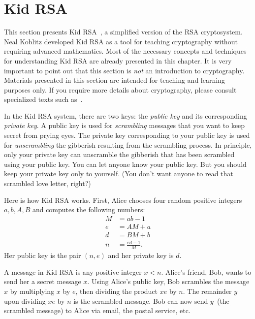 
\section{Kid RSA}

This section presents Kid RSA~\cite[p.17]{Koblitz1998}, a simplified
version of the RSA cryptosystem. Neal
Koblitz developed Kid RSA as a
tool for teaching cryptography without requiring advanced
mathematics. Most of the necessary concepts and techniques for
understanding Kid RSA are already presented in this chapter. It is
very important to point out that this section is \emph{not} an
introduction to cryptography. Materials presented in this section are
intended for teaching and learning purposes only. If you require more
details about cryptography, please consult specialized texts such
as~\cite{MenezesEtAl1996,Stinson2006,TrappeWashington2006}.

In the Kid RSA system, there are two keys: the
\emph{public key} and its corresponding
\emph{private key}. A public key is used for
\emph{scrambling} messages that you want to keep secret from prying
eyes. The private key corresponding to your public key is used for
\emph{unscrambling} the gibberish resulting from the scrambling
process. In principle, only your private key can unscramble the
gibberish that has been scrambled using your public key. You can let
anyone know your public key. But you should keep your private key only
to yourself. (You don't want anyone to read that scrambled love
letter, right?)

Here is how Kid RSA works. First, Alice chooses four random positive
integers $a, b, A, B$ and computes the following numbers:
%
\begin{align*}
M &= ab - 1 \\[4pt]
e &= AM + a \\[4pt]
d &= BM + b \\[4pt]
n &= \frac{ed - 1}{M}.
\end{align*}
%
Her public key is the pair $(n, e)$ and her private key is $d$.

A message in Kid RSA is any positive integer $x < n$. Alice's friend,
Bob, wants to send her a secret message $x$. Using Alice's public key,
Bob scrambles the message $x$ by multiplying $x$ by $e$, then dividing
the product $xe$ by $n$. The remainder $y$ upon dividing $xe$ by $n$
is the scrambled message. Bob can now send $y$~(the scrambled message)
to Alice via email, the postal service, etc.


